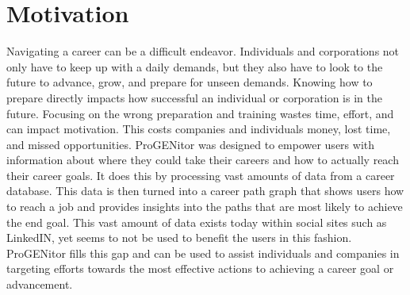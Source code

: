 \section{Motivation}
\label{sect:motivation}
Navigating a career can be a difficult endeavor.  Individuals and corporations
not only have to keep up with a daily demands, but they also have to look to the
future to advance, grow, and prepare for unseen demands.  Knowing how to prepare
directly impacts how successful an individual or corporation is in the future. 
Focusing on the wrong preparation and training wastes time, effort, and can
impact motivation.  This costs companies and individuals money, lost time, and
missed opportunities.  ProGENitor was designed to empower users with information
about where they could take their careers and how to actually reach their career
goals.  It does this by processing vast amounts of data from a career database. 
This data is then turned into a career path graph that shows users how to reach
a job and provides insights into the paths that are most likely to achieve the
end goal.  This vast amount of data exists today within social sites such as
LinkedIN, yet seems to not be used to benefit the users in this fashion. 
ProGENitor fills this gap and can be used to assist individuals and companies
in targeting efforts towards the most effective actions to achieving a career
goal or advancement.
